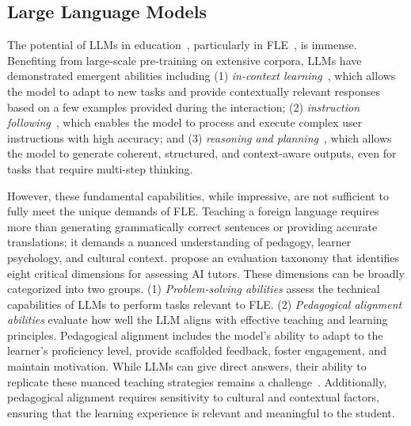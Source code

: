 \subsection{Large Language Models}
The potential of LLMs in education~\cite{alhafni2024llms}, particularly in FLE~\cite{gao2024exploring,karatacs2024incorporating}, is immense. Benefiting from large-scale pre-training on extensive corpora, LLMs have demonstrated emergent abilities including (1) \textit{in-context learning}~\cite{dong2022survey}, which allows the model to adapt to new tasks and provide contextually relevant responses based on a few examples provided during the interaction; (2) \textit{instruction following}~\cite{zeng2024evaluating}, which enables the model to process and execute complex user instructions with high accuracy; and (3) \textit{reasoning and planning}~\cite{huang2024understanding}, which allows the model to generate coherent, structured, and context-aware outputs, even for tasks that require multi-step thinking.

However, these fundamental capabilities, while impressive, are not sufficient to fully meet the unique demands of FLE. Teaching a foreign language requires more than generating grammatically correct sentences or providing accurate translations; it demands a nuanced understanding of pedagogy, learner psychology, and cultural context. \citet{maurya2024unifying} propose an evaluation taxonomy that identifies eight critical dimensions for assessing AI tutors. These dimensions can be broadly categorized into two groups. (1) \textit{Problem-solving abilities} assess the technical capabilities of LLMs to perform tasks relevant to FLE. (2) \textit{Pedagogical alignment abilities} evaluate how well the LLM aligns with effective teaching and learning principles. Pedagogical alignment includes the model's ability to adapt to the learner's proficiency level, provide scaffolded feedback, foster engagement, and maintain motivation. While LLMs can give direct answers, their ability to replicate these nuanced teaching strategies remains a challenge~\cite{wang2024challenges}. Additionally, pedagogical alignment requires sensitivity to cultural and contextual factors, ensuring that the learning experience is relevant and meaningful to the student.




